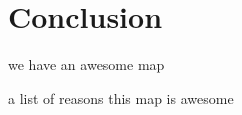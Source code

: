 \section{Conclusion}
\label{sec:conclusion}
we have an awesome map

a list of reasons this map is awesome